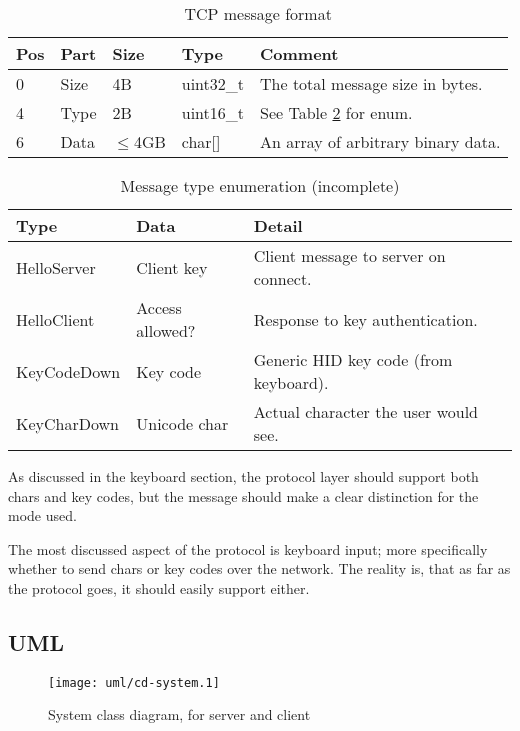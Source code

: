 \begin{table}
  \begin{tabular}{|l|l|l|l|l|}
    \hline
    \textbf{Pos} &
    \textbf{Part} &
    \textbf{Size} &
    \textbf{Type} &
    \textbf{Comment} \\
    \hline
    0 & Size & 4B & uint32\_t & The total message size in bytes. \\
    4 & Type & 2B & uint16\_t & See Table \ref{tab:messageTypes} for enum. \\
    6 & Data & $\leq$4GB & char[] & An array of arbitrary binary data. \\
    \hline
  \end{tabular}
  \caption{TCP message format}
  \label{tab:messageFormat}
\end{table}

\begin{table}
  \begin{tabular}{|l|l|l|}
    \hline
    \textbf{Type} &
    \textbf{Data} &
    \textbf{Detail} \\
    \hline
    HelloServer & Client key & Client message to server on connect. \\
    HelloClient & Access allowed? & Response to key authentication. \\
    KeyCodeDown & Key code & Generic HID key code (from keyboard). \\
    KeyCharDown & Unicode char & Actual character the user would see. \\
    \hline
  \end{tabular}
  \caption{Message type enumeration (incomplete)}
  \label{tab:messageTypes}
\end{table}

As discussed in the keyboard section, the protocol layer should support both
chars and key codes, but the message should make a clear distinction for the
mode used.

The most discussed aspect of the protocol is keyboard input; more specifically
whether to send chars or key codes over the network. The reality is, that as far
as the protocol goes, it should easily support either.

\clearpage
\subsection{UML}

\begin{figure}[ht!]
  \begin{center}
    \texttt{[image: uml/cd-system.1]}
    \caption{System class diagram, for server and client}
    \label{fig:systemClassDiagram}
  \end{center}
\end{figure}

